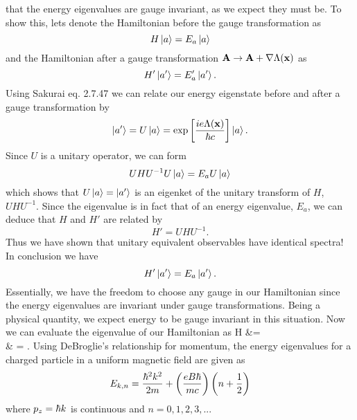 \documentclass[11pt,letterpaper]{article}
\begin{document}
		that the energy eigenvalues are gauge invariant, as we expect they must be. To show this, lets denote the Hamiltonian before the 
		gauge transformation as 
		\[
			H\ket a = E_a\ket a
		\]
		and the Hamiltonian after a gauge transformation $\mathbf{A} \to \mathbf{A} +\nabla \Lambda(\mathbf{x})$ as
		\[
			H'\ket{a'} = E_a'\ket{a'}.
		\]
		Using Sakurai eq. 2.7.47 we can relate our energy eigenstate before and after a gauge transformation by
		\[
			\ket{a'} = U\ket{a} = \exp\left[\frac{ie\Lambda(\mathbf{x})}{\hbar c}\right]\ket a.
		\]
		Since $U$ is a unitary operator, we can form
		\[
			UHU^{-1}U\ket a = E_aU\ket a
		\]
		which shows that $U\ket a=  \ket{a'}$ is an eigenket of the unitary transform of $H$, $UHU^{-1}$. Since the eigenvalue is in fact 			that of an energy eigenvalue, $E_a$, we can deduce that $H$ and $H'$ are related by
		\[
			H' = UHU^{-1}.
		\]
		Thus we have shown that unitary equivalent observables have identical spectra! In conclusion we have
		\[
			H'\ket{a'} = E_a\ket{a'}.
		\]
		Essentially, we have the freedom to choose any gauge in our Hamiltonian since the energy eigenvalues are 
		invariant under gauge transformations. Being a physical quantity, we expect energy to be gauge invariant in this situation. Now we 
		can evaluate the eigenvalue of our Hamiltonian as
		\ba
			H &=  \\
			& =  .
		\ea
		Using DeBroglie's relationship for momentum, the energy eigenvalues for a charged particle in a uniform magnetic field are given
		as
		\[
			E_{k,n} = \frac{\hbar^2k^2}{2m} + \left(\frac{eB\hbar}{mc}\right)\left(n+\frac 12\right)
		\]
		where $p_z = \hbar k$ is continuous and $n = 0,1,2,3,..$. 
	\eenum 
	
 \eenum
 
 
\end{document}
